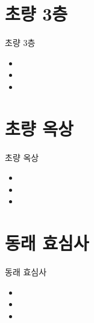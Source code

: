 \documentclass[aspectratio=1610,17pt,xcolor=pdftex,dvipsnames,table,handout]{beamer}
\begin{document}
		\section{ 초량 3층  }
		\frame [plain] {\sectionpage}

		\begin{frame} [t,plain]
			\begin{block} { 초량 3층  }
			\begin{itemize}
				\item  
  				\item  
				\item  
			\end{itemize}
			\end{block}
		\end{frame}



		\section{ 초량 옥상 }
		\frame [plain] {\sectionpage}

		\begin{frame} [t,plain]
			\begin{block} { 초량 옥상 }
			\begin{itemize}
				\item  
  				\item  
				\item  
			\end{itemize}
			\end{block}
		\end{frame}


		\section{ 동래 효심사 }
		\frame [plain] {\sectionpage}

		\begin{frame} [t,plain]
			\begin{block} { 동래 효심사 }
			\begin{itemize}
				\item  
  				\item  
				\item  
			\end{itemize}
			\end{block}
		\end{frame}
\end{document}
